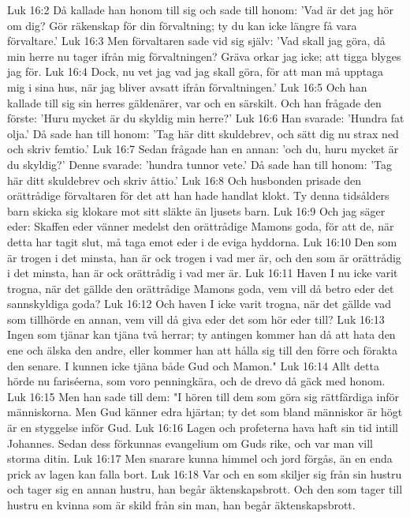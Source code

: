 Luk 16:2  Då kallade han honom till sig och sade till honom: 'Vad är det jag hör om dig? Gör räkenskap för din förvaltning; ty du kan icke längre få vara förvaltare.'
Luk 16:3  Men förvaltaren sade vid sig själv: 'Vad skall jag göra, då min herre nu tager ifrån mig förvaltningen? Gräva orkar jag icke; att tigga blyges jag för.
Luk 16:4  Dock, nu vet jag vad jag skall göra, för att man må upptaga mig i sina hus, när jag bliver avsatt ifrån förvaltningen.'
Luk 16:5  Och han kallade till sig sin herres gäldenärer, var och en särskilt. Och han frågade den förste: 'Huru mycket är du skyldig min herre?'
Luk 16:6  Han svarade: 'Hundra fat olja.' Då sade han till honom: 'Tag här ditt skuldebrev, och sätt dig nu strax ned och skriv femtio.'
Luk 16:7  Sedan frågade han en annan: 'och du, huru mycket är du skyldig?' Denne svarade: 'hundra tunnor vete.' Då sade han till honom: 'Tag här ditt skuldebrev och skriv åttio.'
Luk 16:8  Och husbonden prisade den orättrådige förvaltaren för det att han hade handlat klokt. Ty denna tidsålders barn skicka sig klokare mot sitt släkte än ljusets barn.
Luk 16:9  Och jag säger eder: Skaffen eder vänner medelst den orättrådige Mamons goda, för att de, när detta har tagit slut, må taga emot eder i de eviga hyddorna.
Luk 16:10  Den som är trogen i det minsta, han är ock trogen i vad mer är, och den som är orättrådig i det minsta, han är ock orättrådig i vad mer är.
Luk 16:11  Haven I nu icke varit trogna, när det gällde den orättrådige Mamons goda, vem vill då betro eder det sannskyldiga goda?
Luk 16:12  Och haven I icke varit trogna, när det gällde vad som tillhörde en annan, vem vill då giva eder det som hör eder till?
Luk 16:13  Ingen som tjänar kan tjäna två herrar; ty antingen kommer han då att hata den ene och älska den andre, eller kommer han att hålla sig till den förre och förakta den senare. I kunnen icke tjäna både Gud och Mamon."
Luk 16:14  Allt detta hörde nu fariséerna, som voro penningkära, och de drevo då gäck med honom.
Luk 16:15  Men han sade till dem: "I hören till dem som göra sig rättfärdiga inför människorna. Men Gud känner edra hjärtan; ty det som bland människor är högt är en styggelse inför Gud.
Luk 16:16  Lagen och profeterna hava haft sin tid intill Johannes. Sedan dess förkunnas evangelium om Guds rike, och var man vill storma ditin.
Luk 16:17  Men snarare kunna himmel och jord förgås, än en enda prick av lagen kan falla bort.
Luk 16:18  Var och en som skiljer sig från sin hustru och tager sig en annan hustru, han begår äktenskapsbrott. Och den som tager till hustru en kvinna som är skild från sin man, han begår äktenskapsbrott.

